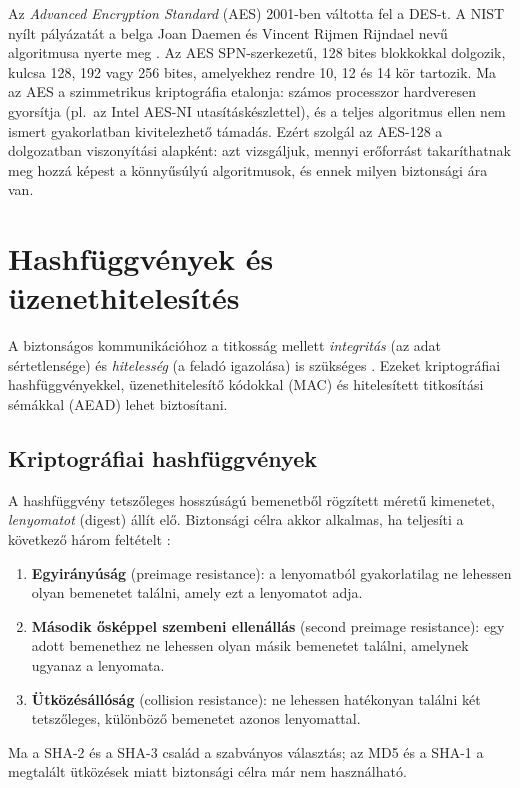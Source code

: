 \documentclass[a4paper,12pt]{report}
\theoremstyle{definition}
\theoremstyle{remark}
\begin{document}
Az \emph{Advanced Encryption Standard} (AES) 2001-ben váltotta fel a DES-t. A NIST nyílt pályázatát a belga Joan Daemen és Vincent Rijmen Rijndael nevű algoritmusa nyerte meg \cite{FIPS197}. Az AES SPN-szerkezetű, 128 bites blokkokkal dolgozik, kulcsa 128, 192 vagy 256 bites, amelyekhez rendre 10, 12 és 14 kör tartozik. Ma az AES a szimmetrikus kriptográfia etalonja: számos processzor hardveresen gyorsítja (pl.~az Intel AES-NI utasításkészlettel), és a teljes algoritmus ellen nem ismert gyakorlatban kivitelezhető támadás. Ezért szolgál az AES-128 a dolgozatban viszonyítási alapként: azt vizsgáljuk, mennyi erőforrást takaríthatnak meg hozzá képest a könnyűsúlyú algoritmusok, és ennek milyen biztonsági ára van.

\section{Hashfüggvények és üzenethitelesítés}\label{sec:hash}

A biztonságos kommunikációhoz a titkosság mellett \emph{integritás} (az adat sértetlensége) és \emph{hitelesség} (a feladó igazolása) is szükséges \cite{Stallings2017}. Ezeket kriptográfiai hashfüggvényekkel, üzenethitelesítő kódokkal (MAC) és hitelesített titkosítási sémákkal (AEAD) lehet biztosítani.

\subsection{Kriptográfiai hashfüggvények}

A hashfüggvény tetszőleges hosszúságú bemenetből rögzített méretű kimenetet, \emph{lenyomatot} (digest) állít elő. Biztonsági célra akkor alkalmas, ha teljesíti a következő három feltételt \cite{Paar2010}:
\begin{enumerate}
	\item \textbf{Egyirányúság} (preimage resistance): a lenyomatból gyakorlatilag ne lehessen olyan bemenetet találni, amely ezt a lenyomatot adja.
	\item \textbf{Második ősképpel szembeni ellenállás} (second preimage resistance): egy adott bemenethez ne lehessen olyan másik bemenetet találni, amelynek ugyanaz a lenyomata.
	\item \textbf{Ütközésállóság} (collision resistance): ne lehessen hatékonyan találni két tetszőleges, különböző bemenetet azonos lenyomattal.
\end{enumerate}
Ma a SHA-2 és a SHA-3 család a szabványos választás; az MD5 és a SHA-1 a megtalált ütközések miatt biztonsági célra már nem használható.
\end{document}
